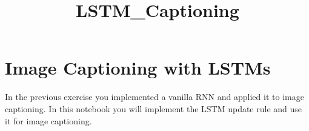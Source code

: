 \documentclass[11pt]{article}
\title{LSTM\_Captioning}
\begin{document}
    
    
    \maketitle
    
    

    
    \hypertarget{image-captioning-with-lstms}{%
\section{Image Captioning with
LSTMs}\label{image-captioning-with-lstms}}

In the previous exercise you implemented a vanilla RNN and applied it to
image captioning. In this notebook you will implement the LSTM update
rule and use it for image captioning.
\end{document}
